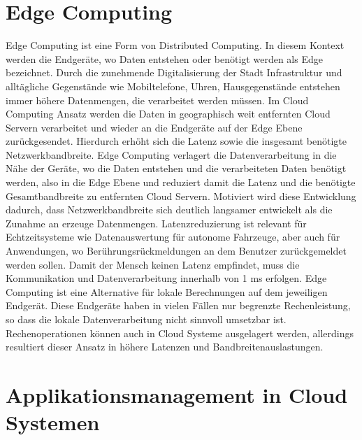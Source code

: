 \section{Edge Computing}

Edge Computing ist eine Form von Distributed Computing. In diesem Kontext werden die Endgeräte, wo Daten entstehen oder benötigt werden als Edge bezeichnet. Durch die zunehmende Digitalisierung der Stadt Infrastruktur und alltägliche Gegenstände wie Mobiltelefone, Uhren, Hausgegenstände entstehen immer höhere Datenmengen, die verarbeitet werden müssen. Im Cloud Computing Ansatz werden die Daten in geographisch weit entfernten Cloud Servern verarbeitet und wieder an die Endgeräte auf der Edge Ebene zurückgesendet. Hierdurch erhöht sich die Latenz sowie die insgesamt benötigte Netzwerkbandbreite. Edge Computing verlagert die Datenverarbeitung in die Nähe der Geräte, wo die Daten entstehen und die verarbeiteten Daten benötigt werden, also in die Edge Ebene und reduziert damit die Latenz und die benötigte Gesamtbandbreite zu entfernten Cloud Servern. \cite{Wang2019} Motiviert wird diese Entwicklung dadurch, dass Netzwerkbandbreite sich deutlich langsamer entwickelt als die Zunahme an erzeuge Datenmengen.\cite{Shi2016} Latenzreduzierung ist relevant für Echtzeitsysteme wie Datenauswertung für autonome Fahrzeuge, aber auch für Anwendungen, wo Berührungsrückmeldungen an dem Benutzer zurückgemeldet werden sollen. Damit der Mensch keinen Latenz empfindet, muss die Kommunikation und Datenverarbeitung innerhalb von 1 ms erfolgen. \cite{Varsha2017} Edge Computing ist eine Alternative für lokale Berechnungen auf dem jeweiligen Endgerät. Diese Endgeräte haben in vielen Fällen nur begrenzte Rechenleistung, so dass die lokale Datenverarbeitung nicht sinnvoll umsetzbar ist. Rechenoperationen können auch in Cloud Systeme ausgelagert werden, allerdings resultiert dieser Ansatz in höhere Latenzen und Bandbreitenauslastungen. \cite{Lin2020} 

\section{Applikationsmanagement in Cloud Systemen}

